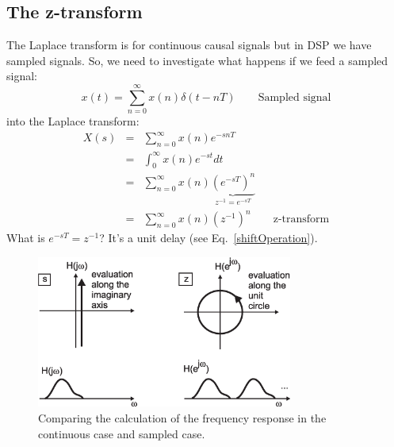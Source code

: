 \documentclass[12pt,a4paper]{article}
\begin{document}
\subsection{The z-transform}
The Laplace transform is for continuous causal signals but in DSP
we have sampled signals. So, we need to investigate what happens
if we feed a sampled signal:
\begin{equation}
x(t) = \sum_{n = 0}^{\infty} x(n) \delta(t - nT) \qquad \mbox{Sampled signal} 
\end{equation} 
into the Laplace transform:
\begin{eqnarray}
X(s) & = & \sum_{n = 0}^{\infty} x(n) e^{-snT} \\
     & = & \int_{0}^{\infty} x(n) e^{-st} dt \\
     & = & \sum_{n = 0}^{\infty} x(n) \underbrace{(e^{-sT})^{n}}_{z^{-1} = e^{-sT}} \\
     & = & \sum_{n = 0}^{\infty} x(n) (z^{-1})^{n} \qquad \mbox{z-transform}
\end{eqnarray}
What is $e^{-sT} = z^{-1}$? It's a unit delay (see Eq.~\ref{shiftOperation}).


\begin{figure}[!hbt]
\begin{center}
\mbox{\includegraphics[width=0.75\textwidth]{frequency_response}}
\end{center}
\caption{Comparing the calculation of the frequency response
in the continuous case and sampled case.
\label{frequency_response}}
\end{figure}
\end{document}
